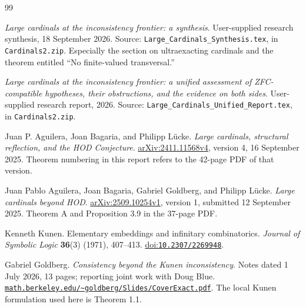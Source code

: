 \documentclass[11pt,letterpaper]{article}
\theoremstyle{definition}
\numberwithin{equation}{section}
\newcommand{\arxiv}[1]{\href{https://arxiv.org/abs/#1}{arXiv:#1}}
\newcommand{\doi}[1]{\href{https://doi.org/#1}{doi:\nolinkurl{#1}}}
\begin{document}
\begin{thebibliography}{99}

\emph{Large cardinals at the inconsistency frontier: a synthesis}.
User-supplied research synthesis, 18 September 2026.
Source: \nolinkurl{Large_Cardinals_Synthesis.tex}, in \nolinkurl{Cardinals2.zip}.
Especially the section on ultraexacting cardinals and the theorem entitled
``No finite-valued transversal.''

\emph{Large cardinals at the inconsistency frontier: a unified assessment of ZFC-compatible hypotheses, their obstructions, and the evidence on both sides}.
User-supplied research report, 2026.
Source: \nolinkurl{Large_Cardinals_Unified_Report.tex}, in \nolinkurl{Cardinals2.zip}.

Juan P. Aguilera, Joan Bagaria, and Philipp L\"ucke.
\emph{Large cardinals, structural reflection, and the HOD Conjecture}.
\arxiv{2411.11568v4}, version 4, 16 September 2025.
Theorem numbering in this report refers to the 42-page PDF of that version.

Juan Pablo Aguilera, Joan Bagaria, Gabriel Goldberg, and Philipp L\"ucke.
\emph{Large cardinals beyond HOD}.
\arxiv{2509.10254v1}, version 1, submitted 12 September 2025.
Theorem A and Proposition 3.9 in the 37-page PDF.

Kenneth Kunen.
Elementary embeddings and infinitary combinatorics.
\emph{Journal of Symbolic Logic} \textbf{36}(3) (1971), 407--413.
\doi{10.2307/2269948}.

Gabriel Goldberg.
\emph{Consistency beyond the Kunen inconsistency}.
Notes dated 1 July 2026, 13 pages; reporting joint work with Doug Blue.
\href{https://math.berkeley.edu/~goldberg/Slides/CoverExact.pdf}{\nolinkurl{math.berkeley.edu/~goldberg/Slides/CoverExact.pdf}}.
The local Kunen formulation used here is Theorem 1.1.

\end{thebibliography}
\end{document}
